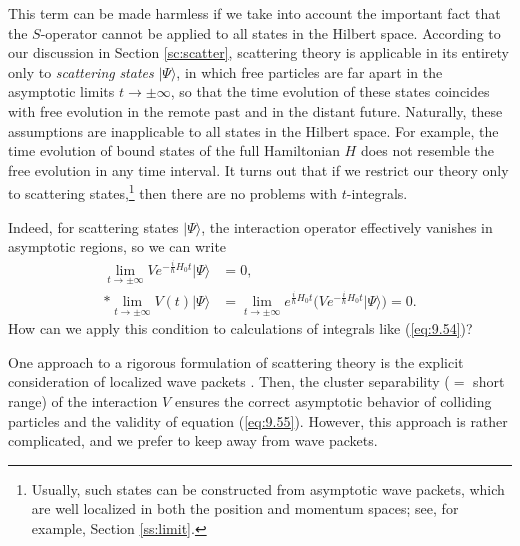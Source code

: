 \documentclass[]{stefan1}
\begin{document}
This term can be made harmless if we take into account the important
fact that the $ S $-operator cannot be applied to all states in the
Hilbert space. According to our discussion in Section
\ref{sc:scatter}, scattering theory is applicable in its entirety only
to \emph{scattering} \emph{states} $ | \Psi \rangle $,
 in which free particles are far apart in the
asymptotic limits $ t \to \pm \infty $, so that the time evolution of
these states coincides with free evolution in the remote past and in the
distant future. Naturally, these assumptions are inapplicable to all
states in the Hilbert space. For example, the time evolution of bound
states of the full Hamiltonian $ H $ does not resemble the free
evolution in any time interval. It turns out that if we restrict our
theory only to scattering states,\footnote{Usually, such states can
be constructed from asymptotic wave packets, which are well localized
in both the position and momentum spaces; see, for example, Section
\ref{ss:limit}.} then there are no problems with $ t $-integrals.

Indeed, for scattering states $|\Psi \rangle $, the interaction operator
effectively vanishes in asymptotic regions, so we can write\vadjust{\goodbreak}
%
\begin{align}
\lim_{t \to \pm \infty } V e^{-\frac{i}{\hbar }H_{0}t}|\Psi \rangle &= 0,
\nonumber
\\*
\lim_{t \to \pm \infty }V(t)|\Psi \rangle &= \lim_{t \to \pm \infty
}e^{\frac{i}{\hbar }H_{0}t}
\bigl( V e^{-\frac{i}{\hbar }H_{0}t}|\Psi \rangle \bigr) = 0. \label{eq:9.55}
\end{align}
How can we apply this condition to calculations of integrals like
(\ref{eq:9.54})?

One approach to a rigorous formulation of scattering theory is the
explicit consideration of localized wave packets
\cite{Goldberger}. Then, the cluster separability ($=$ short range) of the
interaction $ V $ ensures the correct asymptotic behavior of colliding
particles and the validity of equation (\ref{eq:9.55}). However, this
approach is rather complicated, and we prefer to keep away from wave
packets.
\end{document}
